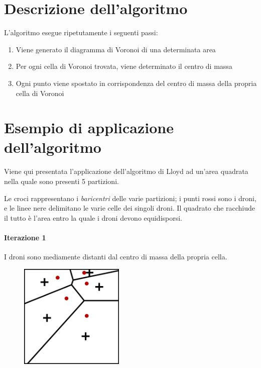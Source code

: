 \documentclass[11pt,a4paper]{report}
\begin{document}
\section{Descrizione dell'algoritmo}

L'algoritmo esegue ripetutamente i seguenti passi:

\begin{enumerate}
	\item Viene generato il diagramma di Voronoi di una determinata area
	\item Per ogni cella di Voronoi trovata, viene determinato il centro di massa
	\item Ogni punto viene spostato in corrispondenza del centro di massa della propria cella di Voronoi
\end{enumerate}

\section{Esempio di applicazione dell'algoritmo}

Viene qui presentata l'applicazione dell'algoritmo di Lloyd ad un'area quadrata nella quale sono presenti 5 partizioni.

Le croci rappresentano i \textit{baricentri} delle varie partizioni; i punti rossi sono i droni, e le linee nere delimitano le varie celle dei singoli droni. Il quadrato che racchiude il tutto è l'area entro la quale i droni devono equidisporsi.

\paragraph{Iterazione 1}

I droni sono mediamente distanti dal centro di massa della propria cella.

\begin{figure}[H]
\includegraphics[width=5cm]{lloyd_iterazione_1.png}
\centering
\end{figure}
\end{document}
